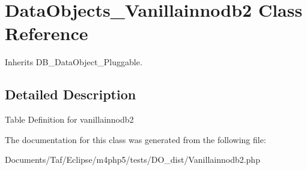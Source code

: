 \hypertarget{classDataObjects__Vanillainnodb2}{
\section{DataObjects\_\-Vanillainnodb2 Class Reference}
\label{classDataObjects__Vanillainnodb2}
}
Inherits DB\_\-DataObject\_\-Pluggable.



\subsection{Detailed Description}
Table Definition for vanillainnodb2 

The documentation for this class was generated from the following file:\begin{CompactItemize}
\item 
Documents/Taf/Eclipse/m4php5/tests/DO\_\-dist/Vanillainnodb2.php\end{CompactItemize}
